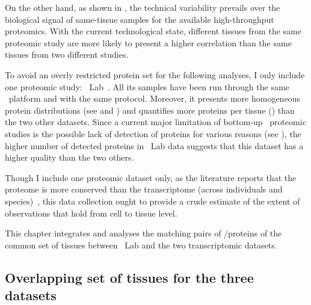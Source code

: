 On the other hand,
as shown in ,
the technical variability prevails over
the biological signal of same-tissue samples
for the available high-throughput proteomics.
With the current technological state,
different tissues from the same proteomic study are more likely
to present a higher correlation
than the same tissues from two different studies.\mybr\

To avoid an overly restricted protein set for the following analyses,
I only include one proteomic study: \pandey\ Lab~.
All its samples have been run through the same \ms\ platform and
with the same protocol.
Moreover, it presents more homogeneous protein distributions
(see  and ) and
quantifies more proteins per tissue ()
than the two other datasets.
Since a current major limitation of bottom-up \ms\ proteomic studies
is the possible lack of detection of proteins for various reasons
(see ),
the higher number of detected proteins in \pandey\ Lab data suggests that
this dataset has a higher quality than the two others.\mybr\


Though I include one proteomic dataset only,
as the literature reports that
the proteome is more conserved than the transcriptome
(across individuals and species)~,
this data collection ought to provide
a crude estimate of the extent of observations
that hold from cell to tissue level.\mybr\

This chapter integrates and analyses the matching pairs of \mRNA/proteins
of the common set of tissues between \pandey\ Lab
and the two transcriptomic datasets.\mybr\

\subsection{Overlapping set of tissues for the three datasets}

